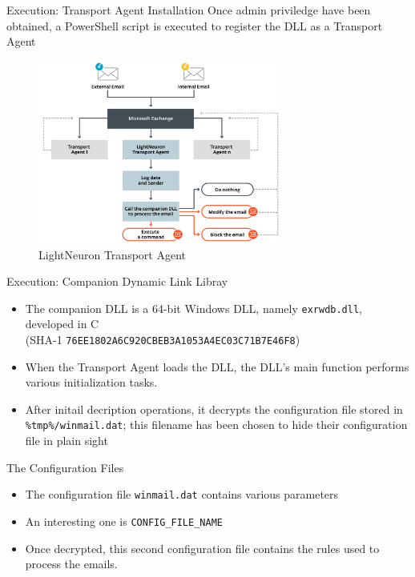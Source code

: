 \begin{frame}[fragile]{Execution: Transport Agent Installation}
    Once admin priviledge have been obtained, a PowerShell script is executed to 
    register the DLL as a Transport Agent
    \begin{figure}
        \includegraphics[width=8cm]{figures/transport_agent.PNG}
        \caption{LightNeuron Transport Agent}
    \end{figure}
\end{frame}

\begin{frame}[fragile]{Execution: Companion Dynamic Link Libray}
    \begin{itemize}
        \item The companion DLL is a 64-bit Windows DLL, namely \texttt{exrwdb.dll}, developed in C \\(SHA-1 \texttt{76EE1802A6C920CBEB3A1053A4EC03C71B7E46F8})
        \item When the Transport Agent loads the DLL, 
        the DLL’s main function performs various initialization tasks.
        \item After initail decription operations, it decrypts 
        the configuration file stored in \texttt{\%tmp\%/winmail.dat}; 
        this filename has been chosen to hide their configuration file in plain sight
    \end{itemize}
\end{frame}

\begin{frame}[fragile]{The Configuration Files}
    \begin{itemize}
        \item The configuration file \texttt{winmail.dat} contains various parameters
        \item An interesting one is \texttt{CONFIG\_FILE\_NAME}
        \item Once decrypted, this second configuration file contains the rules used to process the emails.
    \end{itemize}
\end{frame}

